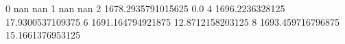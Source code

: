 0 nan nan
1 nan nan
2 1678.2935791015625 0.0
4 1696.2236328125 17.9300537109375
6 1691.164794921875 12.8712158203125
8 1693.459716796875 15.1661376953125
